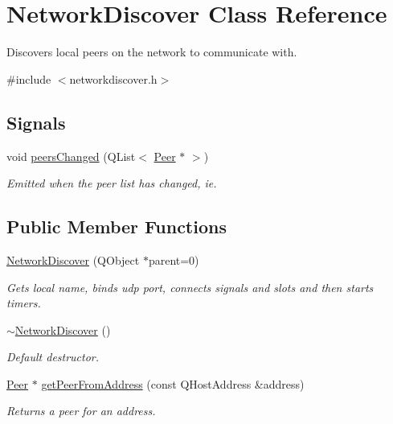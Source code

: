 \hypertarget{class_network_discover}{
\section{\-Network\-Discover \-Class \-Reference}
\label{class_network_discover}
}


\-Discovers local peers on the network to communicate with.  




{\ttfamily \#include $<$networkdiscover.\-h$>$}

\subsection*{\-Signals}
\begin{DoxyCompactItemize}
\item 
void \hyperlink{class_network_discover_a42566247e43198ea9cce91eb5f15511d}{peers\-Changed} (\-Q\-List$<$ \hyperlink{class_peer}{\-Peer} $\ast$ $>$)
\begin{DoxyCompactList}\small\item\em \-Emitted when the peer list has changed, ie. \end{DoxyCompactList}\end{DoxyCompactItemize}
\subsection*{\-Public \-Member \-Functions}
\begin{DoxyCompactItemize}
\item 
\hyperlink{class_network_discover_a35d97308463f9cbe622767b2d364bdbb}{\-Network\-Discover} (\-Q\-Object $\ast$parent=0)
\begin{DoxyCompactList}\small\item\em \-Gets local name, binds udp port, connects signals and slots and then starts timers. \end{DoxyCompactList}\item 
\hypertarget{class_network_discover_a416e23eb1f6925197596731e3c5f325e}{
\hyperlink{class_network_discover_a416e23eb1f6925197596731e3c5f325e}{$\sim$\-Network\-Discover} ()}
\label{class_network_discover_a416e23eb1f6925197596731e3c5f325e}

\begin{DoxyCompactList}\small\item\em \-Default destructor. \end{DoxyCompactList}\item 
\hyperlink{class_peer}{\-Peer} $\ast$ \hyperlink{class_network_discover_a91ec8539ddfeb90f6735d05f2f10b97a}{get\-Peer\-From\-Address} (const \-Q\-Host\-Address \&address)
\begin{DoxyCompactList}\small\item\em \-Returns a peer for an address. \end{DoxyCompactList}\end{DoxyCompactItemize}
